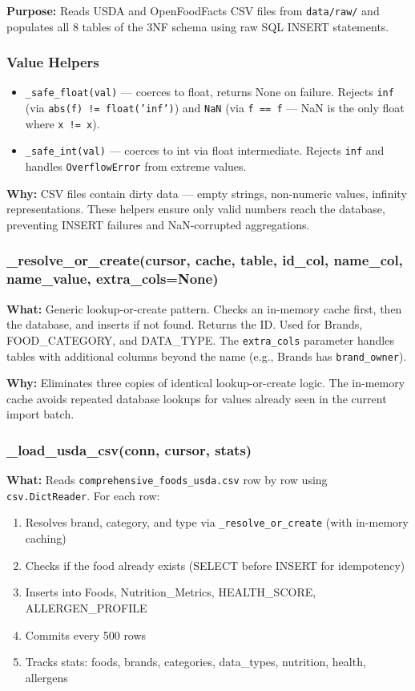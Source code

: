 \documentclass[12pt,a4paper]{article}
\begin{document}
\textbf{Purpose:} Reads USDA and OpenFoodFacts CSV files from \texttt{data/raw/} and populates all 8 tables of the 3NF schema using raw SQL INSERT statements.

\subsubsection{Value Helpers}
\begin{itemize}[nosep]
    \item \texttt{\_safe\_float(val)} — coerces to float, returns None on failure. Rejects \texttt{inf} (via \texttt{abs(f) != float('inf')}) and \texttt{NaN} (via \texttt{f == f} — NaN is the only float where \texttt{x != x}).
    \item \texttt{\_safe\_int(val)} — coerces to int via float intermediate. Rejects \texttt{inf} and handles \texttt{OverflowError} from extreme values.
\end{itemize}

\textbf{Why:} CSV files contain dirty data — empty strings, non-numeric values, infinity representations. These helpers ensure only valid numbers reach the database, preventing INSERT failures and NaN-corrupted aggregations.

\subsubsection{\_resolve\_or\_create(cursor, cache, table, id\_col, name\_col, name\_value, extra\_cols=None)}
\textbf{What:} Generic lookup-or-create pattern. Checks an in-memory cache first, then the database, and inserts if not found. Returns the ID. Used for Brands, FOOD\_CATEGORY, and DATA\_TYPE. The \texttt{extra\_cols} parameter handles tables with additional columns beyond the name (e.g., Brands has \texttt{brand\_owner}).

\textbf{Why:} Eliminates three copies of identical lookup-or-create logic. The in-memory cache avoids repeated database lookups for values already seen in the current import batch.

\subsubsection{\_load\_usda\_csv(conn, cursor, stats)}
\textbf{What:} Reads \texttt{comprehensive\_foods\_usda.csv} row by row using \texttt{csv.DictReader}. For each row:
\begin{enumerate}[nosep]
    \item Resolves brand, category, and type via \texttt{\_resolve\_or\_create} (with in-memory caching)
    \item Checks if the food already exists (SELECT before INSERT for idempotency)
    \item Inserts into Foods, Nutrition\_Metrics, HEALTH\_SCORE, ALLERGEN\_PROFILE
    \item Commits every 500 rows
    \item Tracks stats: foods, brands, categories, data\_types, nutrition, health, allergens
\end{enumerate}
\end{document}
